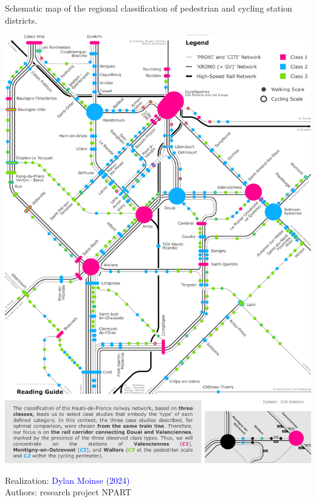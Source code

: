 \begin{refsegment}
    \begin{carte}[h!]\vspace*{4pt}
        \caption{Schematic map of the regional classification of pedestrian and cycling station districts.}
        \label{fig-chap6:schema-reseau-train-hdf-classes}
        \centerline{\includegraphics[width=1\columnwidth]{src/Figures/Chap-6/EN_Carte_Reseau_classification.pdf}}
        \vspace{5pt}
        \begin{flushright}\scriptsize{
        Realization: \textcolor{blue}{Dylan Moinse (2024)}
        \\
        Authors: research project \acrshort{NPART}
        }\end{flushright}
    \end{carte}


\end{refsegment}

